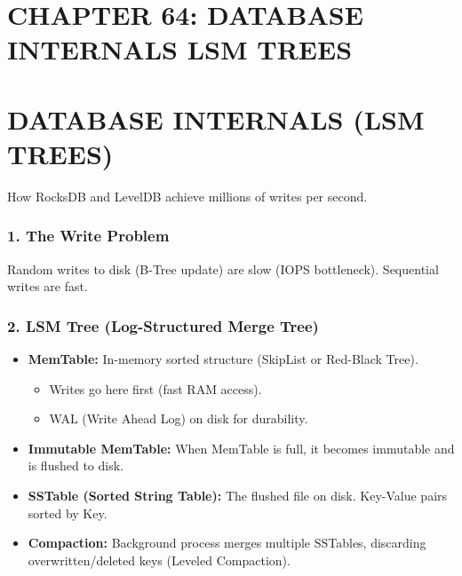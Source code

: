 \hypertarget{chapter-64-database-internals-lsm-trees}{%
\section{CHAPTER 64: DATABASE INTERNALS LSM
TREES}\label{chapter-64-database-internals-lsm-trees}}

\hypertarget{database-internals-lsm-trees}{%
\section{DATABASE INTERNALS (LSM
TREES)}\label{database-internals-lsm-trees}}

How RocksDB and LevelDB achieve millions of writes per second.

\hypertarget{the-write-problem}{%
\subsubsection{1. The Write Problem}\label{the-write-problem}}

Random writes to disk (B-Tree update) are slow (IOPS bottleneck).
Sequential writes are fast.

\hypertarget{lsm-tree-log-structured-merge-tree}{%
\subsubsection{2. LSM Tree (Log-Structured Merge
Tree)}\label{lsm-tree-log-structured-merge-tree}}

\begin{itemize}
\tightlist
\item
  \textbf{MemTable:} In-memory sorted structure (SkipList or Red-Black
  Tree).

  \begin{itemize}
  \tightlist
  \item
    Writes go here first (fast RAM access).
  \item
    WAL (Write Ahead Log) on disk for durability.
  \end{itemize}
\item
  \textbf{Immutable MemTable:} When MemTable is full, it becomes
  immutable and is flushed to disk.
\item
  \textbf{SSTable (Sorted String Table):} The flushed file on disk.
  Key-Value pairs sorted by Key.
\item
  \textbf{Compaction:} Background process merges multiple SSTables,
  discarding overwritten/deleted keys (Leveled Compaction).
\end{itemize}

